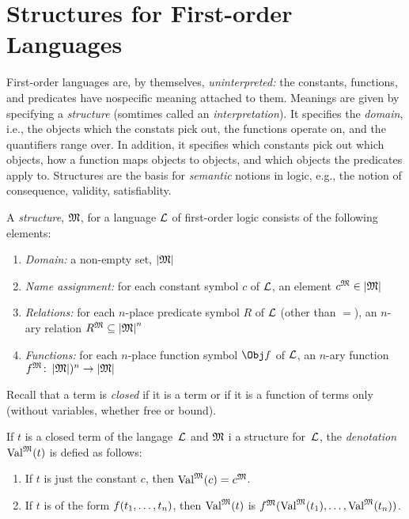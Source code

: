 \documentclass[open-logic-section]{subfiles}
\begin{document}
\section{Structures for First-order Languages}

\begin{wordy}
First-order languages are, by themselves, \emph{uninterpreted:} the
constants, functions, and predicates have nospecific meaning attached
to them.  Meanings are given by specifying a \emph{structure}
(somtimes called an \emph{interpretation}).  It specifies the
\emph{domain}, i.e., the objects which the constats pick out, the
functions operate on, and the quantifiers range over. In addition, it
specifies which constants pick out which objects, how a function maps
objects to objects, and which objects the predicates apply to.
Structures are the basis for \emph{semantic} notions in logic, e.g.,
the notion of consequence, validity, satisfiablity.
\end{wordy}

\begin{defn}[Structure]
A \emph{structure}, $\mathfrak{M}$, for a language $\mathcal{L}$ of
first-order logic consists of the following elements:
\begin{enumerate}
\item \emph{Domain:} a non-empty set, $\left| \mathfrak M \right|$ 
\item \emph{Name assignment:} for each constant symbol $c$ of
  $\mathcal{L}$, an element $c^{\mathfrak M} \in \left| \mathfrak M \right|$
\item \emph{Relations:} for each $n$-place predicate symbol $R$ of
  $\mathcal{L}$ (other than $=$), an $n$-ary relation $R^{\mathfrak M}
  \subseteq \left| \mathfrak M \right|^n$
\item \emph{Functions:} for each $n$-place function symbol $\Obj f$ of
  $\mathcal{L}$, an $n$-ary function $f^{\mathfrak M} \colon
  \left| \mathfrak M \right|)^n \to \left| \mathfrak M \right|$
\end{enumerate}
\end{defn}

\begin{wordy}
Recall that a term is \emph{closed} if it is a term or if it is a
function of terms only (without variables, whether free or bound).
\end{wordy}

\begin{defn}
If $t$ is a closed term of the langage~$\mathcal L$ and $\mathfrak M$ i a structure for~$\mathcal L$, the \emph{denotation}~$\Value{t}{M}$ is defied as follows:
\begin{enumerate}
\item If $t$ is just the constant $c$, then $\Value{c}{M} = \Assign{c}{M}$.
\item If $t$ is of the form ${ f(t_1, \ldots, t_n) }$, then
  $\Value{t}{M}$ is $\Assign{f}{M}(\Value{t_1}{M}, \ldots,
  \Value{t_n}{M})$.
\end{enumerate}
\end{defn}
\end{document}
